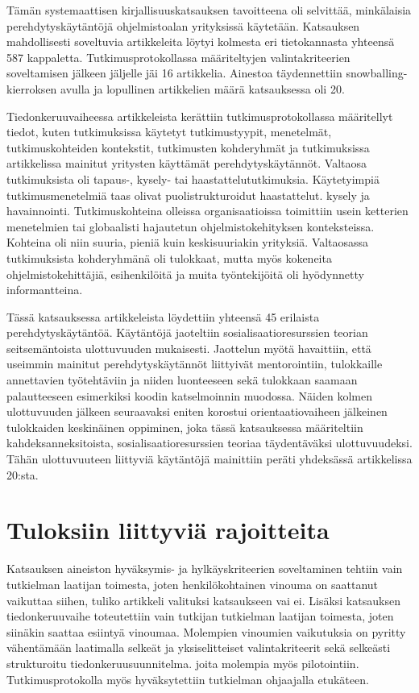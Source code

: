 \documentclass[utf8]{gradu3}
\begin{document}
Tämän systemaattisen kirjallisuuskatsauksen tavoitteena oli selvittää, minkälaisia perehdytyskäytäntöjä ohjelmistoalan yrityksissä käytetään. Katsauksen mahdollisesti soveltuvia artikkeleita löytyi kolmesta eri tietokannasta yhteensä 587 kappaletta. Tutkimusprotokollassa määriteltyjen valintakriteerien soveltamisen jälkeen jäljelle jäi 16 artikkelia. Ainestoa täydennettiin snowballing-kierroksen avulla ja lopullinen artikkelien määrä katsauksessa oli 20.

Tiedonkeruuvaiheessa artikkeleista kerättiin tutkimusprotokollassa määritellyt tiedot, kuten tutkimuksissa käytetyt tutkimustyypit, menetelmät, tutkimuskohteiden kontekstit, tutkimusten kohderyhmät ja tutkimuksissa artikkelissa mainitut yritysten käyttämät perehdytyskäytännöt. Valtaosa tutkimuksista oli tapaus-, kysely- tai haastattelututkimuksia. Käytetyimpiä tutkimusmenetelmiä taas olivat puolistrukturoidut haastattelut. kysely ja havainnointi. Tutkimuskohteina olleissa organisaatioissa toimittiin usein ketterien menetelmien tai globaalisti hajautetun ohjelmistokehityksen  konteksteissa. Kohteina oli niin suuria, pieniä kuin keskisuuriakin yrityksiä. Valtaosassa tutkimuksista kohderyhmänä oli tulokkaat, mutta myös kokeneita ohjelmistokehittäjiä, esihenkilöitä ja muita työntekijöitä oli hyödynnetty informantteina. 

Tässä katsauksessa artikkeleista löydettiin yhteensä 45 erilaista perehdytyskäytäntöä. Käytäntöjä jaoteltiin sosialisaatioresurssien teorian seitsemäntoista ulottuvuuden mukaisesti. Jaottelun myötä havaittiin, että useimmin mainitut perehdytyskäytännöt liittyivät mentorointiin, tulokkaille annettavien työtehtäviin ja niiden luonteeseen sekä tulokkaan saamaan palautteeseen esimerkiksi koodin katselmoinnin muodossa. Näiden kolmen ulottuvuuden jälkeen seuraavaksi eniten korostui orientaatiovaiheen jälkeinen tulokkaiden keskinäinen oppiminen, joka tässä katsauksessa määriteltiin kahdeksanneksitoista, sosialisaatioresurssien teoriaa täydentäväksi ulottuvuudeksi. Tähän ulottuvuuteen liittyviä käytäntöjä mainittiin peräti yhdeksässä artikkelissa 20:sta.


\section{Tuloksiin liittyviä rajoitteita}
\label{luku-rajoitteet}

Katsauksen aineiston hyväksymis- ja hylkäyskriteerien soveltaminen tehtiin vain tutkielman laatijan toimesta, joten henkilökohtainen vinouma on saattanut vaikuttaa siihen, tuliko artikkeli valituksi katsaukseen vai ei. Lisäksi katsauksen tiedonkeruuvaihe toteutettiin vain tutkijan tutkielman laatijan toimesta, joten siinäkin saattaa esiintyä vinoumaa. Molempien vinoumien vaikutuksia on pyritty vähentämään laatimalla selkeät ja yksiselitteiset valintakriteerit sekä selkeästi strukturoitu tiedonkeruusuunnitelma. joita molempia myös pilotointiin. Tutkimusprotokolla myös hyväksytettiin tutkielman ohjaajalla etukäteen.
\end{document}
